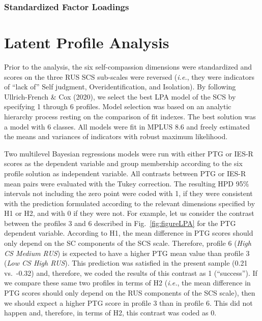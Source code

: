 \documentclass[
  english,
  man,floatsintext]{apa7}
\begin{document}
\begin{appendix}
\newpage

\hypertarget{standardized-factor-loadings-3}{%
\subsubsection{Standardized Factor
Loadings}\label{standardized-factor-loadings-3}}



\newpage

\hypertarget{latent-profile-analysis}{%
\section{Latent Profile Analysis}\label{latent-profile-analysis}}

Prior to the analysis, the six self-compassion dimensions were
standardized and scores on the three RUS SCS sub-scales were reversed
(\emph{i.e.}, they were indicators of ``lack of'' Self judgment,
Overidentification, and Isolation). By following Ullrich-French \& Cox
(2020), we select the best LPA model of the SCS by specifying 1 through
6 profiles. Model selection was based on an analytic hierarchy process
resting on the comparison of fit indexes. The best solution was a model
with 6 classes. All models were fit in MPLUS 8.6 and freely estimated
the means and variances of indicators with robust maximum likelihood.

Two multilevel Bayesian regressions models were run with either PTG or
IES-R scores as the dependent variable and group membership according to
the six profile solution as independent variable. All contrasts between
PTG or IES-R mean pairs were evaluated with the Tukey correction. The
resulting HPD 95\% intervals not including the zero point were coded
with 1, if they were consistent with the prediction formulated according
to the relevant dimensions specified by H1 or H2, and with 0 if they
were not. For example, let us consider the contrast between the profiles
3 and 6 described in Fig.~\ref{fig:figureLPA} for the PTG dependent
variable. According to H1, the mean difference in PTG scores should only
depend on the SC components of the SCS scale. Therefore, profile 6
(\emph{High CS Medium RUS}) is expected to have a higher PTG mean value
than profile 3 (\emph{Low CS High RUS}). This prediction was satisfied
in the present sample (0.21 vs.~-0.32) and, therefore, we coded the
results of this contrast as 1 (``success''). If we compare these same
two profiles in terms of H2 (\emph{i.e.}, the mean difference in PTG
scores should only depend on the RUS components of the SCS scale), then
we should expect a higher PTG score in profile 3 than in profile 6. This
did not happen and, therefore, in terms of H2, this contrast was coded
as 0.


\end{appendix}
\end{document}
